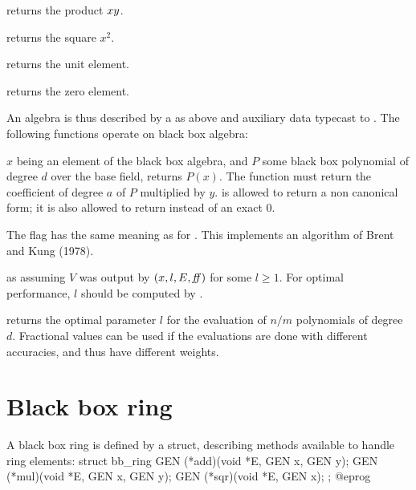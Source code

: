  returns the product $x\*y$.

 returns the square $x^2$.

 returns the unit element.

 returns the zero element.

An algebra is thus described by a  as above and
auxiliary data typecast to . The following functions operate on
black box algebra:

$x$ being an element of the black box algebra, and $P$ some black box
polynomial of degree $d$ over the base field,  returns $P(x)$. The function
 must return the coefficient of degree $a$ of $P$
multiplied by $y$.  is allowed to return a non canonical form;
it is also allowed to return  instead of an exact $0$.

The flag  has the same meaning as for . This
implements an algorithm of Brent and Kung (1978).

as  assuming $V$ was output by
$(x, l, E, \hbox{\it ff\/})$ for some $l\geq 1$. For optimal
performance, $l$ should be computed by .

 returns the optimal
parameter $l$ for the evaluation of $n/m$ polynomials of degree $d$.
Fractional values can be used if the evaluations are done with different
accuracies, and thus have different weights.



\section{Black box ring}

A black box ring is defined by a  struct, describing methods
available to handle ring elements:
\bprog
struct bb_ring
{
  GEN (*add)(void *E, GEN x, GEN y);
  GEN (*mul)(void *E, GEN x, GEN y);
  GEN (*sqr)(void *E, GEN x);
};
@eprog

